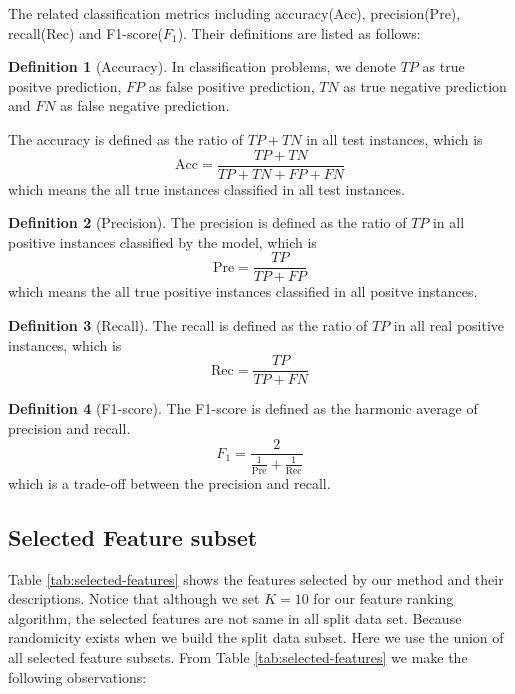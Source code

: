 \documentclass{ieeeaccess}
\theoremstyle{definition}
\newtheorem{defn}{Definition}
\begin{document}
The related classification metrics including accuracy(Acc), precision(Pre), recall(Rec) and F1-score($F_1$). Their definitions are listed as follows:

\begin{defn}[Accuracy]
    In classification problems, we denote $TP$ as true positve prediction, $FP$ as false positive prediction, $TN$ as true negative prediction and $FN$ as false negative prediction.

    The accuracy is defined as the ratio of $TP+TN$ in all test instances, which is
    \begin{equation}
        \text{Acc}=\frac{TP+TN}{TP+TN+FP+FN}
    \end{equation}
    which means the all true instances classified in all test instances.
\end{defn}

\begin{defn}[Precision]
    The precision is defined as the ratio of $TP$ in all positive instances classified by the model, which is
    \begin{equation}
        \text{Pre} = \frac{TP}{TP+FP}
    \end{equation}
    which means the all true positive instances classified in all positve instances.
\end{defn}

\begin{defn}[Recall]
    The recall is defined as the ratio of $TP$ in all real positive instances, which is
    \begin{equation}
        \text{Rec} = \frac{TP}{TP+FN}
    \end{equation}
\end{defn}

\begin{defn}[F1-score]
    The F1-score is defined as the harmonic average of precision and recall.
    \begin{equation}
        F_1 = \frac{2}{\frac{1}{\text{Pre}} + \frac{1}{\text{Rec}}}
    \end{equation}
    which is a trade-off between the precision and recall.
\end{defn}

\subsection{Selected Feature subset}

Table \ref{tab:selected-features} shows the features selected by our method and their descriptions. Notice that although we set $K=10$ for our feature ranking algorithm, the selected features are not same in all split data set. Because randomicity exists when we build the split data subset. Here we use the union of all selected feature subsets. From Table \ref{tab:selected-features} we make the following observations:
\end{document}
